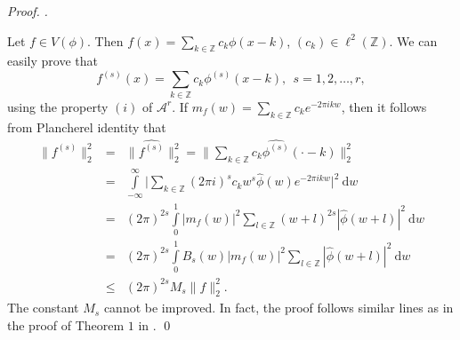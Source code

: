 \documentclass[a4paper,12pt,reqno]{amsart}
\theoremstyle{plain}
\numberwithin{equation}{section}
\theoremstyle{definition}
\newenvironment{pf}[1][]{%
 \vskip 3mm
 \noindent
 \ifthenelse{\equal{#1}{}}%
  {{\slshape Proof. }}%
  {{\slshape #1.} }%
 }%
{\qed\bigskip}
\newcommand{\ds}{\displaystyle}
\begin{document}
\begin{pf}
Let $f\in V(\phi)$. Then $f(x)=\ds\sum\limits_{k\in\mathbb{Z}}c_k\phi(x-k)$, $(c_k)\in\ell^2(\mathbb{Z})$. We can easily prove that
$$f^{(s)}(x)=\ds\sum\limits_{k\in\mathbb{Z}}c_k\phi^{(s)}(x-k), ~~ s=1,2,\dots,r,$$
using the property $(i)$ of $\mathcal{A}^r$.
If $m_f(w)=\ds\sum\limits_{k\in\mathbb{Z}}c_ke^{-2\pi ikw}$,
then it follows from Plancherel identity that
\begin{eqnarray}
\|f^{(s)}\|_2^2&=&\|\widehat{f^{(s)}}\|^2_2=\big\|\sum\limits_{k\in\mathbb{Z}}c_k\widehat{\phi^{(s)}}(\cdot-k)\big\|^2_2\nonumber\\
&=&\int\limits_{-\infty}^{\infty}\Big|\sum\limits_{k\in\mathbb{Z}}(2\pi i)^{s}c_kw^s\widehat{\phi}(w)e^{-2\pi ikw}\Big|^2~\mathrm{d}w\nonumber\\
&=&(2\pi)^{2s}\int\limits_{0}^{1}|m_f(w)|^2\sum\limits_{l\in\mathbb{Z}}(w+l)^{2s}|\widehat{\phi}(w+l)|^2~\mathrm{d}w\nonumber\\
&=&(2\pi)^{2s}\int\limits_{0}^{1}B_{s}(w)|m_f(w)|^2\sum\limits_{l\in\mathbb{Z}}|\widehat{\phi}(w+l)|^2~\mathrm{d}w\nonumber\\
&\leq&(2\pi)^{2s}M_{s}\|f\|_2^2.\nonumber
\end{eqnarray}
The constant $M_s$ cannot be improved. In fact, the proof follows similar lines as in the proof of Theorem $1$ in \cite{BaZo}.
\end{pf}
\end{document}
